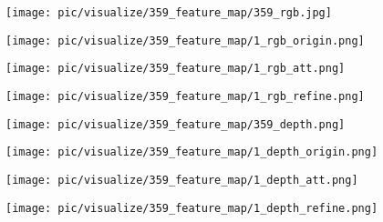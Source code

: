 \documentclass[10pt,twocolumn,letterpaper]{article}
\begin{document}
\begin{figure*}[t]
   
   \begin{minipage}[c]{0.115\linewidth}
      \texttt{[image: pic/visualize/359\_feature\_map/359\_rgb.jpg]}
   \end{minipage}
   \begin{minipage}[c]{0.115\linewidth}
      \texttt{[image: pic/visualize/359\_feature\_map/1\_rgb\_origin.png]}
   \end{minipage}
   \begin{minipage}[c]{0.115\linewidth}
      \texttt{[image: pic/visualize/359\_feature\_map/1\_rgb\_att.png]}
   \end{minipage}
   \begin{minipage}[c]{0.115\linewidth}
      \texttt{[image: pic/visualize/359\_feature\_map/1\_rgb\_refine.png]}
   \end{minipage}\hspace{3pt}
      \begin{minipage}[c]{0.115\linewidth}
      \texttt{[image: pic/visualize/359\_feature\_map/359\_depth.png]}
   \end{minipage}
   \begin{minipage}[c]{0.115\linewidth}
      \texttt{[image: pic/visualize/359\_feature\_map/1\_depth\_origin.png]}
   \end{minipage}
   \begin{minipage}[c]{0.115\linewidth}
      \texttt{[image: pic/visualize/359\_feature\_map/1\_depth\_att.png]}
   \end{minipage}
   \begin{minipage}[c]{0.115\linewidth}
      \texttt{[image: pic/visualize/359\_feature\_map/1\_depth\_refine.png]}
   \end{minipage}
   

\end{figure*}
\end{document}
